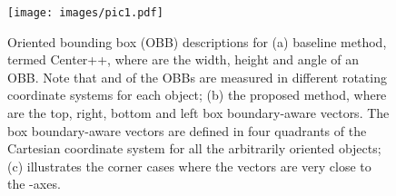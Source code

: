 \documentclass[10pt,twocolumn,letterpaper]{article}
\begin{document}
\begin{figure}[t!]
\begin{center}
   \texttt{[image: images/pic1.pdf]}
\end{center}
\caption{Oriented bounding box (OBB)  descriptions for (a) baseline method, termed Center++, where  are the width, height and angle of an OBB. Note that  and  of the OBBs are measured in different rotating coordinate systems for each object; (b) the proposed method, where  are the top, right, bottom and left box boundary-aware vectors. The box boundary-aware vectors are defined in four quadrants of the Cartesian coordinate system for all the arbitrarily oriented objects; (c) illustrates the corner cases where the vectors are very close to the -axes.}
\label{fig:figure1}
\end{figure}
\end{document}

